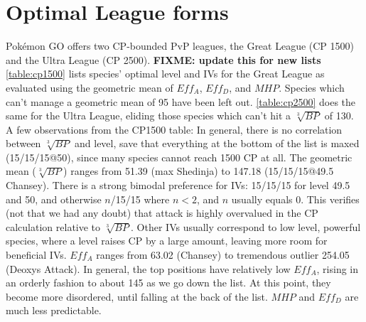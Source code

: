 \section{Optimal League forms}
Pokémon GO offers two CP-bounded PvP leagues, the Great League (CP 1500) and
   the Ultra League (CP 2500).
\textbf{FIXME: update this for new lists}
\autoref{table:cp1500} lists species' optimal level and IVs for the Great League
  as evaluated using the geometric mean of $Eff_A$, $Eff_D$, and $MHP$.
Species which can't manage a geometric mean of 95 have been left out.
\autoref{table:cp2500} does the same for the Ultra League, eliding those species which
  can't hit a $\sqrt[3]{BP}$ of 130.
A few observations from the CP1500 table:
In general, there is no correlation between $\sqrt[3]{BP}$ and level,
  save that everything at the bottom of the list is maxed (15/15/15@50),
  since many species cannot reach 1500 CP at all.
The geometric mean ($\sqrt[3]{BP}$) ranges from 51.39 (max Shedinja)
  to 147.18 (15/15/15@49.5 Chansey).
There is a strong bimodal preference for IVs: 15/15/15 for level 49.5
  and 50, and otherwise $n$/15/15 where $n < 2$, and $n$ usually equals 0.
This verifies (not that we had any doubt) that attack is highly overvalued in the CP calculation relative to $\sqrt[3]{BP}$.
Other IVs usually correspond to low level, powerful species, where a level
  raises CP by a large amount, leaving more room for beneficial IVs.
$Eff_A$ ranges from 63.02 (Chansey) to tremendous outlier 254.05 (Deoxys Attack).
In general, the top positions have relatively low $Eff_A$, rising in an
  orderly fashion to about 145 as we go down the list.
At this point, they become more disordered, until falling at the back
  of the list.
$MHP$ and $Eff_D$ are much less predictable.

